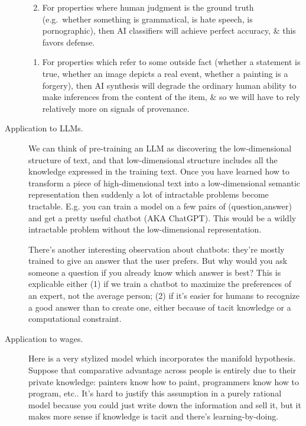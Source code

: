 \documentclass[
  10pt,
  letterpaper,
  DIV=11,
  numbers=noendperiod,
  oneside]{scrartcl}
\providecommand{\tightlist}{%
  \setlength{\itemsep}{0pt}\setlength{\parskip}{0pt}}\usepackage{longtable,booktabs,array}
\begin{document}
\begin{description}
\begin{enumerate}
\def\labelenumi{\arabic{enumi}.}
\tightlist
\item
  For properties where human judgment is the ground truth (e.g.~whether
  something is grammatical, is hate speech, is pornographic), then AI
  classifiers will achieve perfect accuracy, \& this favors defense.
\end{enumerate}

\begin{enumerate}
\def\labelenumi{\arabic{enumi}.}
\setcounter{enumi}{1}
\tightlist
\item
  For properties which refer to some outside fact (whether a statement
  is true, whether an image depicts a real event, whether a painting is
  a forgery), then AI synthesis will degrade the ordinary human ability
  to make inferences from the content of the item, \& so we will have to
  rely relatively more on signals of provenance.
\end{enumerate}
\item[Application to LLMs.]
We can think of pre-training an LLM as discovering the low-dimensional
structure of text, and that low-dimensional structure includes all the
knowledge expressed in the training text. Once you have learned how to
transform a piece of high-dimensional text into a low-dimensional
semantic representation then suddenly a lot of intractable problems
become tractable. E.g. you can train a model on a few pairs of
(question,answer) and get a pretty useful chatbot (AKA ChatGPT). This
would be a wildly intractable problem without the low-dimensional
representation.

There's another interesting observation about chatbots: they're mostly
trained to give an answer that the user prefers. But why would you ask
someone a question if you already know which answer is best? This is
explicable either (1) if we train a chatbot to maximize the preferences
of an expert, not the average person; (2) if it's easier for humans to
recognize a good answer than to create one, either because of tacit
knowledge or a computational constraint.
\item[Application to wages.]
Here is a very stylized model which incorporates the manifold
hypothesis. Suppose that comparative advantage across people is entirely
due to their private knowledge: painters know how to paint, programmers
know how to program, etc.. It's hard to justify this assumption in a
purely rational model because you could just write down the information
and sell it, but it makes more sense if knowledge is tacit and there's
learning-by-doing.


\end{description}
\end{document}
